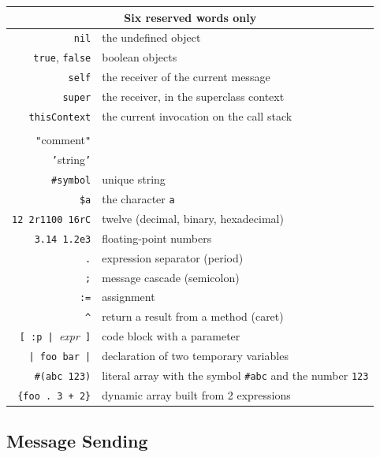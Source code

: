 \documentclass[notumble]{leaflet}
\newcommand{\code}[1]{\foreignlanguage{english}{\texttt{#1}}}
\begin{document}
\noindent
\begin{tabularx}{\linewidth}{@{}rX@{}}
        \toprule
        \multicolumn{2}{c}{Six reserved words only}\\
        \midrule
        \code{nil} & the undefined object\\
        \code{true}, \code{false} & boolean objects\\
        \code{self} & the receiver of the current message\\
        \code{super} & the receiver, in the superclass context\\
        \code{thisContext} & the current invocation on the call stack\\
        \addlinespace

        \toprule
        \multicolumn{2}{c}{Reserved punctuation characters}\\
        \midrule
        \code{"}{comment}\code{"} & \\
        \code{'}{string}\code{'} & \\
        \code{\#symbol} & unique string \\
        \code{\$a} & the character \code{a} \\
        \code{12 2r1100 16rC} & twelve (decimal, binary, hexadecimal)\\
        \code{3.14 1.2e3} & floating-point numbers\\
        \code{.} & expression separator (period)\\
        \code{;} & message cascade (semicolon)\\
        \code{:=} & {assignment} \\
        \code{\textasciicircum} & return a result from a method (caret)\\
        \code{[\,:p\,|\,}\emph{expr}\code{\,]} & code block with a parameter \\
        \code{|\,foo bar\,|} & declaration of two temporary variables \\
        \code{\#(abc 123)} & literal array with the symbol \code{\#abc} and the number \code{123} \\
        \code{\{foo\,.\ 3\,+\,2\}} & dynamic array built from 2 expressions\\
        \bottomrule
\end{tabularx}

\subsection{Message Sending}
\end{document}
